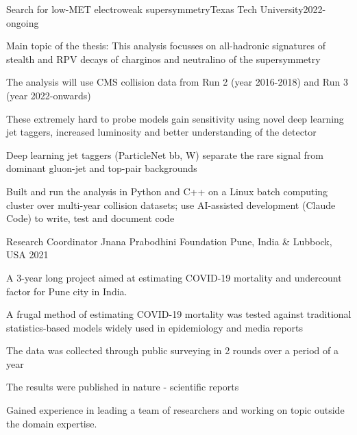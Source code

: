 

\begin{cventries}

\cventry
{}{Search for low-MET electroweak supersymmetry}{Texas Tech University}{2022-ongoing}{
\begin{cvitems}
\item {Main topic of the thesis: This analysis focusses on all-hadronic signatures of stealth and RPV decays of charginos and neutralino of the supersymmetry}
\item {The analysis will use CMS collision data from Run 2 (year 2016-2018) and Run 3 (year 2022-onwards)}
\item {These extremely hard to probe models gain sensitivity using novel deep learning jet taggers, increased luminosity and better understanding of the detector}
\item {Deep learning jet taggers (ParticleNet bb, W) separate the rare signal from dominant gluon-jet and top-pair backgrounds}
\item {Built and run the analysis in Python and C++ on a Linux batch computing cluster over multi-year collision datasets; use AI-assisted development (Claude Code) to write, test and document code}
\end{cvitems}
}

  \cventry
    {Research Coordinator} %
    {Jnana Prabodhini Foundation} %
    {Pune, India \& Lubbock, USA} %
    {2021} %
    {
      \begin{cvitems} %
        \item {A 3-year long project aimed at estimating COVID-19 mortality and undercount factor for Pune city in India.}
        \item {A frugal method of estimating COVID-19 mortality was tested against traditional statistics-based models widely used in epidemiology and media reports}
        \item {The data was collected through public surveying in 2 rounds over a period of a year}
        \item {The results were published in nature - scientific reports}
        \item {Gained experience in leading a team of researchers and working on topic outside the domain expertise.}
      \end{cvitems}
    }


\end{cventries}
